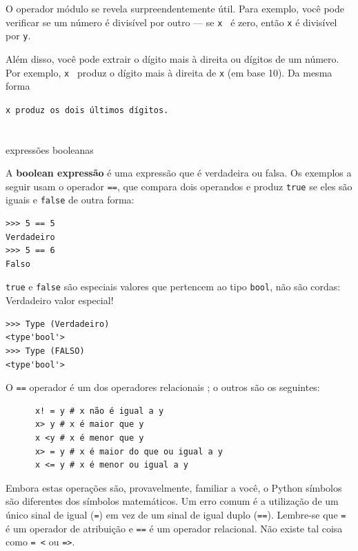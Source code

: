 \documentclass[10pt]{book}
\begin{document}
O operador módulo se revela surpreendentemente útil. Para
exemplo, você pode verificar se um número é divisível por outro --- se
{\tt x \y} é zero, então {\tt x} é divisível por {\tt y}.

Além disso, você pode extrair o dígito mais à direita
ou dígitos de um número. Por exemplo, {\tt x } produz o
dígito mais à direita de {\tt x} (em base 10). Da mesma forma {\tt x %
produz os dois últimos dígitos.


\section{} expressões booleanas

A {\bf boolean expressão} é uma expressão que é verdadeira
ou falsa. Os exemplos a seguir usam o
operador {\tt ==}, que compara dois operandos e produz
{\tt true} se eles são iguais e {\tt false} de outra forma:

\begin{verbatim}
>>> 5 == 5
Verdadeiro
>>> 5 == 6
Falso
\end{verbatim}
%
{\tt true} e {\tt false} são especiais
valores que pertencem ao tipo {\tt bool}, não são cordas:
{Verdadeiro valor especial!} \Index
{}

\begin{verbatim}
>>> Type (Verdadeiro)
<type'bool'>
>>> Type (FALSO)
<type'bool'>
\end{verbatim}
%
O {\tt ==} operador é um dos operadores relacionais {\bf}; o
outros são os seguintes:

\begin{verbatim}
      x! = y # x não é igual a y
      x> y # x é maior que y
      x <y # x é menor que y
      x> = y # x é maior do que ou igual a y
      x <= y # x é menor ou igual a y
\end{verbatim}
%
Embora estas operações são, provavelmente, familiar a você, o Python
símbolos são diferentes dos símbolos matemáticos. Um erro comum
é a utilização de um único sinal de igual ({\tt =}) em vez de um sinal de igual duplo
({\tt ==}). Lembre-se que {\tt =} é um operador de atribuição e
{\tt ==} é um operador relacional. Não existe tal coisa como
{\tt = <} ou {\tt =>}.


}
\end{document}
